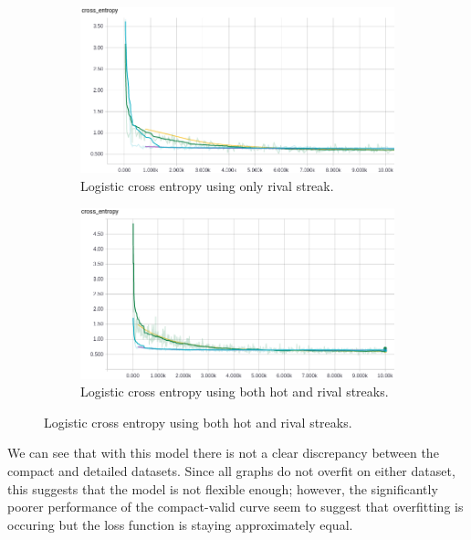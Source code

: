 \documentclass{article} %
\begin{document}
\begin{figure}[!htb]
  \begin{subfigure}{0.5\textwidth}
    \includegraphics[width=\linewidth]{plots/linear-model/streak-r/crossentropy.png}
    \caption{Logistic cross entropy using only rival streak.}\label{fig:linear-r-crossentropy}
  \end{subfigure}
  \begin{subfigure}{0.5\textwidth}
    \includegraphics[width=\linewidth]{plots/linear-model/streak-hr/crossentropy.png}
    \caption{Logistic cross entropy using both hot and rival streaks.}\label{fig:linear-hr-crossentropy}
  \end{subfigure}
\end{figure}


We can see that with this model there is not a clear discrepancy between the compact and detailed datasets.
Since all graphs do not overfit on either dataset, this suggests that the model is not flexible enough; however, the significantly poorer performance of the compact-valid curve seem to suggest that overfitting is occuring but the loss function is staying approximately equal.
\end{document}
